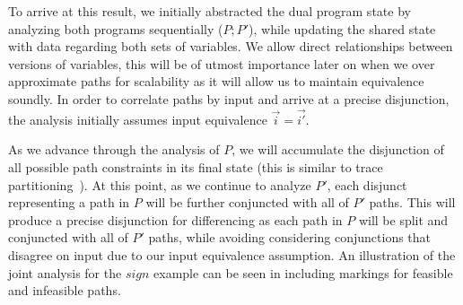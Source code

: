 To arrive at this result, we initially abstracted the dual program state by analyzing both programs sequentially ($P;P'$), while updating the shared state with data regarding both sets of variables. We allow direct relationships between versions of variables, this will be of utmost importance later on when we over approximate paths for scalability as it will allow us to maintain equivalence soundly. In order to correlate paths by input and arrive at a precise disjunction, the analysis initially assumes input equivalence $\vec{i} = \vec{i'}$.

As we advance through the analysis of $P$, we will accumulate the disjunction of all possible path constraints in its final state (this is similar to trace partitioning~\cite{MauborgneRival07}). At this point, as we continue to analyze $P'$, each disjunct representing a path in $P$ will be further conjuncted with all of $P'$ paths. This will produce a precise disjunction for differencing as each path in $P$ will be split and conjuncted with all of $P'$ paths, while avoiding considering conjunctions that disagree on input due to our input equivalence assumption. An illustration of the joint analysis for the $sign$ example can be seen in  including markings for feasible and infeasible paths.



